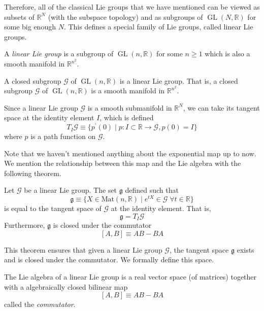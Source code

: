 \documentclass{article}
\DeclareMathOperator{\GL}{GL}
\begin{document}
    Therefore, all of the classical Lie groups that we have mentioned can be viewed as subsets of $\mathbb{R}^N$ (with the subspace topology) and as subgroups of $\GL(N, \mathbb{R})$ for some big enough $N$. This defines a special family of Lie groups, called linear Lie groups. 

    \begin{definition}
    A \textit{linear Lie group} is a subgroup of $\GL(n, \mathbb{R})$ for some $n \geq 1$ which is also a smooth manifold in $\mathbb{R}^{n^2}$. 
    \end{definition}

    \begin{theorem}
    A closed subgroup $\mathcal{G}$ of $\GL(n, \mathbb{R})$ is a linear Lie group. That is, a closed subgroup $\mathcal{G}$ of $\GL(n, \mathbb{R})$ is a smooth manifold in $\mathbb{R}^{n^2}$.
    \end{theorem}

    \begin{definition}
    Since a linear Lie group $\mathcal{G}$ is a smooth submanifold in $\mathbb{R}^N$, we can take its tangent space at the identity element $I$, which is defined 
    \[T_I \mathcal{G} \equiv \{p^\prime (0) \;|\; p: I \subset \mathbb{R} \longrightarrow \mathcal{G}, p(0) = I\}\]
    where $p$ is a path function on $\mathcal{G}$. 
    \end{definition}

    Note that we haven't mentioned anything about the exponential map up to now. We mention the relationship between this map and the Lie algebra with the following theorem. 

    \begin{theorem}
    Let $\mathcal{G}$ be a linear Lie group. The set $\mathfrak{g}$ defined such that
    \[\mathfrak{g} \equiv \{X \in \text{Mat}(n, \mathbb{R}) \; | \; e^{t X} \in \mathcal{G} \; \forall t \in \mathbb{R}\}\]
    is equal to the tangent space of $\mathcal{G}$ at the identity element. That is, 
    \[\mathfrak{g} = T_I \mathcal{G}\]
    Furthermore, $\mathfrak{g}$ is closed under the commutator 
    \[[A,B] \equiv A B - B A\]
    \end{theorem}

    This theorem ensures that given a linear Lie group $\mathcal{G}$, the tangent space $\mathfrak{g}$ exists and is closed under the commutator. We formally define this space. 

    \begin{definition}
    The Lie algebra of a linear Lie group is a real vector space (of matrices) together with a algebraically closed bilinear map 
    \[[A,B] \equiv A B - B A\]
    called the \textit{commutator}. 
    \end{definition} 
\end{document}
